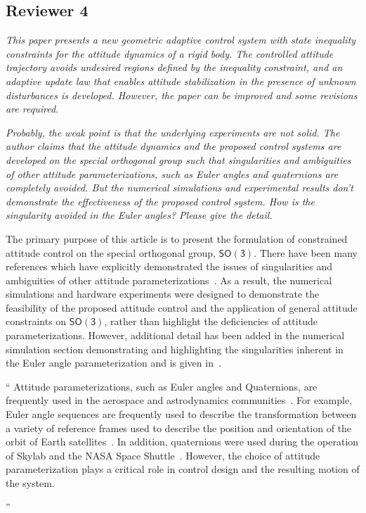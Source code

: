\documentclass[11pt]{article}
\newcommand{\SO}{\ensuremath{\mathsf{SO(3)}}}
\newenvironment{correction}{\begin{list}{}{\setlength{\leftmargin}{1cm}\setlength{\rightmargin}{1cm}}\vspace{\parsep}\item[]``}{''\end{list}}
\begin{document}
\subsection*{Reviewer 4}
\textit{This paper presents a new geometric adaptive control system with state inequality constraints for the attitude dynamics of a rigid body. The controlled attitude trajectory avoids undesired regions defined by the inequality constraint, and an adaptive update law that enables attitude stabilization in the presence of unknown disturbances is developed. However, the paper can be improved and some revisions are required.}

\begin{enumerate}
\item \textit{Probably, the weak point is that the underlying experiments are not solid. The author claims that the attitude dynamics and the proposed control systems are developed on the special orthogonal group such that singularities and ambiguities of other attitude parameterizations, such as Euler angles and quaternions are completely avoided.  But the numerical simulations and experimental results don't demonstrate the effectiveness of the proposed control system. How is the singularity avoided in the Euler angles? Please give the detail.}

The primary purpose of this article is to present the formulation of constrained attitude control on the special orthogonal group, \( \SO \).
There have been many references which have explicitly demonstrated the issues of singularities and ambiguities of other attitude parameterizations~\cite{chaturvedi2011a,bhat2000,hughes2004,shuster1993}.
As a result, the numerical simulations and hardware experiments were designed to demonstrate the feasibility of the proposed attitude control and the application of general attitude constraints on \( \SO \), rather than highlight the deficiencies of attitude parameterizations.
However, additional detail has been added in the numerical simulation section demonstrating and highlighting the singularities inherent in the Euler angle parameterization and is given in~.

\begin{correction}
    Attitude parameterizations, such as Euler angles and Quaternions, are frequently used in the aerospace and astrodynamics communities~\cite{vallado2007}.
For example, Euler angle sequences are frequently used to describe the transformation between a variety of reference frames used to describe the position and orientation of the orbit of Earth satellites~\cite{vallado2007}.
In addition, quaternions were used during the operation of Skylab and the NASA Space Shuttle~\cite{hughes2004}.
However, the choice of attitude parameterization plays a critical role in control design and the resulting motion of the system.


\end{correction}
\end{enumerate}
\end{document}
